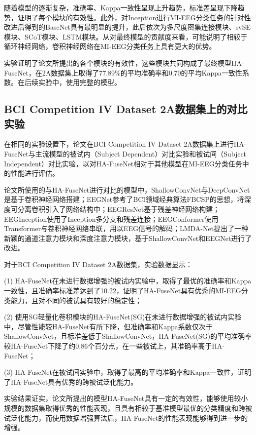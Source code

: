 随着模型的逐渐复杂，准确率、Kappa一致性呈现上升趋势，标准差呈现下降趋势，证明了每个模块的有效性。此外，对Inception进行MI-EEG分类任务的针对性改进后得到的BaseNet具有最明显的提升，此后依次为多尺度密集连接模块、svSE模块、SCoT模块、LSTM模块。从对最终模型的贡献度来看，可能说明了相较于循环神经网络，卷积神经网络在MI-EEG分类任务上具有更大的优势。

实验证明了论文所提出的各个模块的有效性，这些模块共同构成了最终模型HA-FuseNet，在2A数据集上取得了77.89\%的平均准确率和0.70的平均Kappa一致性系数。在后续实验中，使用完整的模型。

\subsection{BCI Competition IV Dataset 2A数据集上的对比实验}

在相同的实验设置下，论文在BCI Competition IV Dataset 2A数据集上进行HA-FuseNet与主流模型的被试内（Subject Dependent）对比实验和被试间（Subject Independent）对比实验，以对HA-FuseNet相对于其他模型在MI-EEG分类任务中的性能进行评估。

论文所使用的与HA-FuseNet进行对比的模型中，ShallowConvNet\cite{schirrmeister2017deep}与DeepConvNet\cite{schirrmeister2017deep}是基于卷积神经网络搭建；EEGNet\cite{lawhern2018eegnet}参考了BCI领域经典算法FBCSP的思想，将深度可分离卷积引入了网络结构中；EEGResNet\cite{HBM:HBM23730}基于残差神经网络\cite{he2016deep}构建；EEGInception\cite{zhang2021eeg}使用了Inception多分支和残差连接；EEGConformer\cite{song2022eeg}使用Transformer\cite{vaswani2017attention}与卷积神经网络串联，用以EEG信号的解码；LMDA-Net\cite{miao2023lmda}提出了一种新颖的通道注意力模块和深度注意力模块，基于ShallowConvNet和EEGNet进行了改进。

对于BCI Competition IV Dataset 2A数据集，实验数据显示：

(1) HA-FuseNet在未进行数据增强的被试内实验中，取得了最优的准确率和Kappa一致性，且准确率标准差达到了10.22，证明了HA-FuseNet具有优秀的MI-EEG分类能力，且对不同的被试具有较好的稳定性；

(2) 使用SG轻量化卷积模块的HA-FuseNet(SG)在未进行数据增强的被试内实验中，尽管性能较HA-FuseNet有所下降，但准确率和Kappa系数仅次于ShallowConvNet，且标准差低于ShallowConvNet，HA-FuseNet(SG)的平均准确率较HA-FuseNet下降了约0.86个百分点，在一些被试上，其准确率高于HA-FuseNet；

(3) HA-FuseNet在被试间实验中，取得了最高的平均准确率和Kappa一致性，证明了HA-FuseNet具有优秀的跨被试泛化能力。

实验结果证实，论文所提出的模型HA-FuseNet具有一定的有效性，能够使用较小规模的数据集取得优秀的性能表现，且具有相较于基准模型最优的分类精度和跨被试泛化能力，而使用数据增强算法后，HA-FuseNet的性能表现能够得到进一步的增强。

